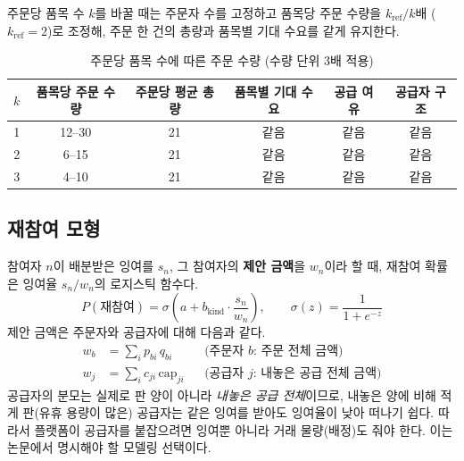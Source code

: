 \documentclass[11pt,a4paper]{article}
\begin{document}
주문당 품목 수 $k$를 바꿀 때는 주문자 수를 고정하고 품목당 주문 수량을 $k_{\mathrm{ref}}/k$배
($k_{\mathrm{ref}}=2$)로 조정해, 주문 한 건의 총량과 품목별 기대 수요를 같게 유지한다.

\begin{table}[H]
\centering\small
\caption{주문당 품목 수에 따른 주문 수량 (수량 단위 3배 적용)}\label{tab:qty}
\begin{tabular}{cccccc}
\toprule
$k$ & 품목당 주문 수량 & 주문당 평균 총량 & 품목별 기대 수요 & 공급 여유 & 공급자 구조\\
\midrule
1 & 12--30 & 21 & 같음 & 같음 & 같음\\
2 & 6--15 & 21 & 같음 & 같음 & 같음\\
3 & 4--10 & 21 & 같음 & 같음 & 같음\\
\bottomrule
\end{tabular}
\end{table}

\subsection{재참여 모형}

참여자 $n$이 배분받은 잉여를 $s_n$, 그 참여자의 \textbf{제안 금액}을 $w_n$이라 할 때,
재참여 확률은 잉여율 $s_n/w_n$의 로지스틱 함수다.
\begin{equation}
  P(\text{재참여}) = \sigma\!\left(a + b_{\mathrm{kind}}\cdot\frac{s_n}{w_n}\right),
  \qquad \sigma(z)=\frac{1}{1+e^{-z}}
\end{equation}
제안 금액은 주문자와 공급자에 대해 다음과 같다.
\begin{align}
  w_b &= \textstyle\sum_i p_{bi}\,q_{bi} && \text{(주문자 $b$: 주문 전체 금액)}\\
  w_j &= \textstyle\sum_i c_{ji}\,\mathrm{cap}_{ji} && \text{(공급자 $j$: 내놓은 공급 전체 금액)}
\end{align}
공급자의 분모는 실제로 판 양이 아니라 \emph{내놓은 공급 전체}이므로,
내놓은 양에 비해 적게 판(유휴 용량이 많은) 공급자는 같은 잉여를 받아도 잉여율이 낮아 떠나기 쉽다.
따라서 플랫폼이 공급자를 붙잡으려면 잉여뿐 아니라 거래 물량(배정)도 줘야 한다.
이는 논문에서 명시해야 할 모델링 선택이다.
\end{document}
